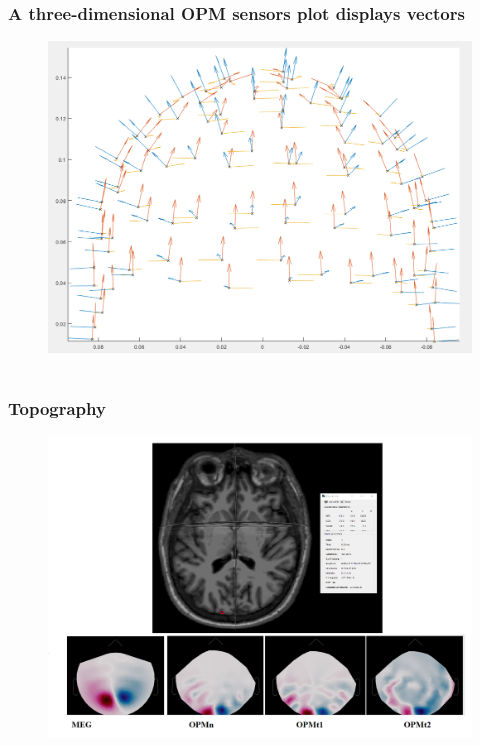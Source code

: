 \documentclass{beamer}
\numberwithin{figure}{section}
\numberwithin{equation}{section}
\begin{document}
\section{}
\begin{frame}
 \frametitle{A three-dimensional OPM sensors plot displays vectors}
	\begin{figure}[p]
  		\centering
  		\includegraphics[width=0.6\linewidth]{pictures/opmvect}
  		\label{fig:approaches_RDF}
 	\end{figure}

  
\end{frame}



\section{}
\begin{frame}
 \frametitle{Topography}
	\begin{figure}[p]
  		\centering
  		\includegraphics[width=0.9\linewidth]{pictures/top2}
  		\label{fig:approaches_RDF}
 	\end{figure}

  
\end{frame}
\end{document}

